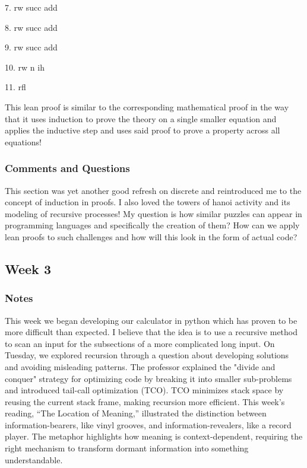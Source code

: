 \documentclass{article}
\theoremstyle{theorem}
\theoremstyle{definition}
\theoremstyle{remark}
\begin{document}
7. rw succ add

8. rw succ add

9. rw succ add

10. rw n ih

11. rfl

This lean proof is similar to the corresponding mathematical proof in the way that it uses induction to prove the theory on a single smaller equation and applies the inductive step and uses said proof to prove a property across all equations!

\subsubsection*{Comments and Questions}

This section was yet another good refresh on discrete and reintroduced me to the concept of induction in proofs. I also loved the towers of hanoi activity and its modeling of recursive processes! My question is how similar puzzles can appear in programming languages and specifically the creation of them? How can we apply lean proofs to such challenges and how will this look in the form of actual code?




\subsection{Week 3}



\subsubsection*{Notes}
This week we began developing our calculator in python which has proven to be more difficult than expected. I believe that the idea is to use a recursive method to scan an input for the subsections of a more complicated long input. On Tuesday, we explored recursion through a question about developing solutions and avoiding misleading patterns. The professor explained the "divide and conquer" strategy for optimizing code by breaking it into smaller sub-problems and introduced tail-call optimization (TCO). TCO minimizes stack space by reusing the current stack frame, making recursion more efficient. This week’s reading, “The Location of Meaning,” illustrated the distinction between information-bearers, like vinyl grooves, and information-revealers, like a record player. The metaphor highlights how meaning is context-dependent, requiring the right mechanism to transform dormant information into something understandable.
\end{document}
